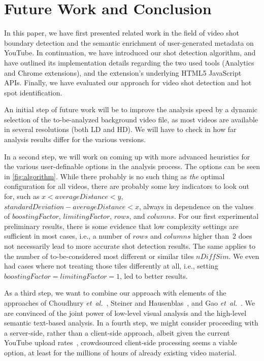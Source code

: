 \documentclass{acm_proc_article-sp}
\begin{document}
\section{Future Work and Conclusion} \label{sec:future-work-conclusion}
In this paper, we have first presented related work in the field of video shot boundary detection and the semantic enrichment of user-generated metadata on YouTube. In continuation, we have introduced our shot detection algorithm, and have outlined its implementation details regarding the two used tools (Analytics and Chrome extensions), and the extension's underlying HTML5 JavaScript APIs. Finally, we have evaluated our approach for video shot detection and hot spot identification.

An initial step of future work will be to improve the analysis speed by a dynamic selection of the to-be-analyzed background video file, as most videos are available in several resolutions (both LD and HD). We will have to check in how far analysis results differ for the various versions.

In a second step, we will work on coming up with more advanced heuristics for the various user-definable options in the analysis process. The options can be seen in \autoref{fig:algorithm}. While there probably is no such thing as \emph{the} optimal configuration for all videos, there are probably some key indicators to look out for, such as $x < \mathit{averageDistance}  < y$, $\mathit{standardDeviation} - \mathit{averageDistance} < x$, always in dependence on the values of $\mathit{boostingFactor}$, $\mathit{limitingFactor}$, $\mathit{rows}$, and $\mathit{columns}$. For our first experimental preliminary results, there is some evidence that low complexity settings are sufficient in most cases, i.e., a number of $\mathit{rows}$ and $\mathit{columns}$ higher than~$2$ does not necessarily lead to more accurate shot detection results. The same applies to the number of to-be-considered most different or similar tiles $\mathit{nDiffSim}$. We even had cases where not treating those tiles differently at all, i.e., setting $\mathit{boostingFactor} = \mathit{limitingFactor} = 1$, led to better results.

As a third step, we want to combine our approach with elements of the approaches of Choudhury \emph{et~al.}~\cite{Choudhury:YouTube}, Steiner and Hausenblas~\cite{semwebvid}, and Gao \emph{et~al.}~\cite{Gao:2009}. We are convinced of the joint power of low-level visual analysis and the high-level semantic text-based analysis. In a fourth step, we might consider proceeding with a server-side, rather than a client-side approach, albeit given the current YouTube upload rates~\cite{youtube:stats}, crowdsourced client-side processing seems a viable option, at least for the millions of hours of already existing video material.
\end{document}
